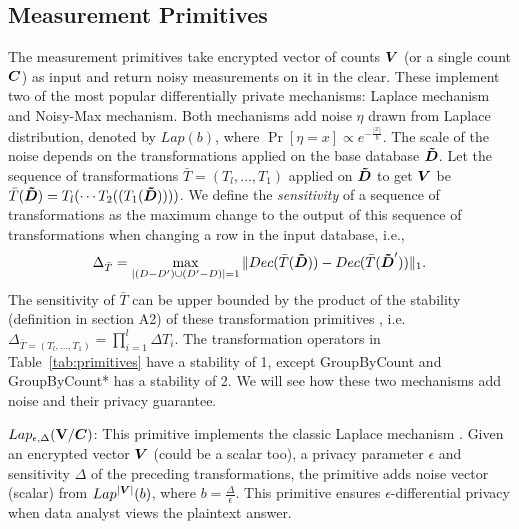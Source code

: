 \subsection{Measurement Primitives} \label{sec:measurement_primitives}
The measurement primitives take encrypted vector of counts $\boldsymbol{V}$ (or a single count $\boldsymbol{C}$) as input and return noisy measurements on it in the clear. These implement two of the most popular differentially private mechanisms: Laplace mechanism and Noisy-Max mechanism.
Both mechanisms add noise $\eta$ drawn from Laplace distribution, denoted by $Lap(b)$, where $\Pr[\eta =x]\propto e^{-{\frac{|x|}{b}}}$. The scale of the noise depends on the transformations applied on the base database $\boldsymbol{\tilde{D}}$. Let the sequence of transformations $\bar{T}=(T_l,\ldots,T_1)$ applied on $\boldsymbol{\tilde{D}}$ to get $\boldsymbol{V}$ be $\bar{T}(\boldsymbol{\tilde{D}}) = T_l(\cdots T_2((T_1(\boldsymbol{\tilde{D}}))))$. We define the \emph{sensitivity} of a sequence of transformations as  the maximum change to the output of this sequence of transformations when changing a row in the input database, i.e.,
$$\Delta_{\bar{T}} = \max_{|(D-D')\cup (D'-D)|=1} \|Dec(\bar{T}(\boldsymbol{\tilde{D}}))-Dec(\bar{T}(\boldsymbol{\tilde{D}}'))\|_1.$$
The sensitivity of $\bar{T}$ can be upper bounded by the product of the stability (definition in section A2) of these transformation primitives , i.e. $\Delta_{\bar{T}=(T_l,\ldots,T_1)} = \prod_{i=1}^l \Delta T_i$. The transformation operators in Table~\ref{tab:primitives} have a stability of 1, except GroupByCount and GroupByCount* has a stability of 2. We will see how these two mechanisms add noise and their privacy guarantee.

 $Lap_{\epsilon,\Delta}(\mathbf{V}/\boldsymbol{C})$:  This primitive implements the classic Laplace mechanism \cite{Dork}.
Given an encrypted vector $\boldsymbol{V}$ (could be a scalar too), a privacy parameter $\epsilon$ and sensitivity $\Delta$ of the preceding transformations, the primitive adds noise vector (scalar) from $Lap^{|\boldsymbol{V}|}(b)$, where $b=\frac{\Delta}{\epsilon}$. This primitive ensures $\epsilon$-differential privacy when data analyst views the plaintext answer.




